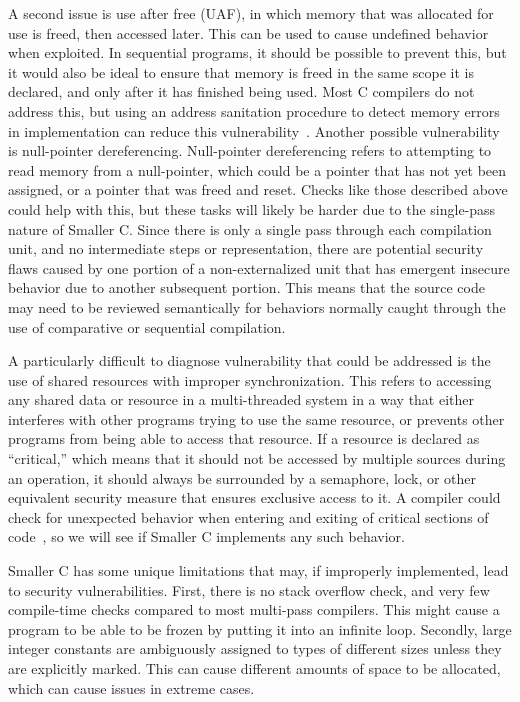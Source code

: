 \documentclass[sigconf, anonymous]{acmart}
\begin{document}
A second issue is use after free (UAF), in which memory that was allocated for use is freed, then accessed later. This can be used to cause undefined behavior when exploited. In sequential programs, it should be possible to prevent this, but it would also be ideal to ensure that memory is freed in the same scope it is declared, and only after it has finished being used. Most C compilers do not address this, but using an address sanitation procedure to detect memory errors in implementation can reduce this vulnerability~\cite{Serebryany:AddressSanitize}. Another possible vulnerability is null-pointer dereferencing. Null-pointer dereferencing refers to attempting to read memory from a null-pointer, which could be a pointer that has not yet been assigned, or a pointer that was freed and reset. Checks like those described above could help with this, but these tasks will likely be harder due to the single-pass nature of Smaller C. Since there is only a single pass through each compilation unit, and no intermediate steps or representation, there are potential security flaws caused by one portion of a non-externalized unit that has emergent insecure behavior due to another subsequent portion. This means that the source code may need to be reviewed semantically for behaviors normally caught through the use of comparative or sequential compilation.



A particularly difficult to diagnose vulnerability that could be addressed is the use of shared resources with improper synchronization. This refers to accessing any shared data or resource in a multi-threaded system in a way that either interferes with other programs trying to use the same resource, or prevents other programs from being able to access that resource. If a resource is declared as “critical,” which means that it should not be accessed by multiple sources during an operation, it should always be surrounded by a semaphore, lock, or other equivalent security measure that ensures exclusive access to it. A compiler could check for unexpected behavior when entering and exiting of critical sections of code~\cite{Li:Finding}, so we will see if Smaller C implements any such behavior.

Smaller C has some unique limitations that may, if improperly implemented, lead to security vulnerabilities. First, there is no stack overflow check, and very few compile-time checks compared to most multi-pass compilers. This might cause a program to be able to be frozen by putting it into an infinite loop. Secondly, large integer constants are ambiguously assigned to types of different sizes unless they are explicitly marked. This can cause different amounts of space to be allocated, which can cause issues in extreme cases.
\end{document}
